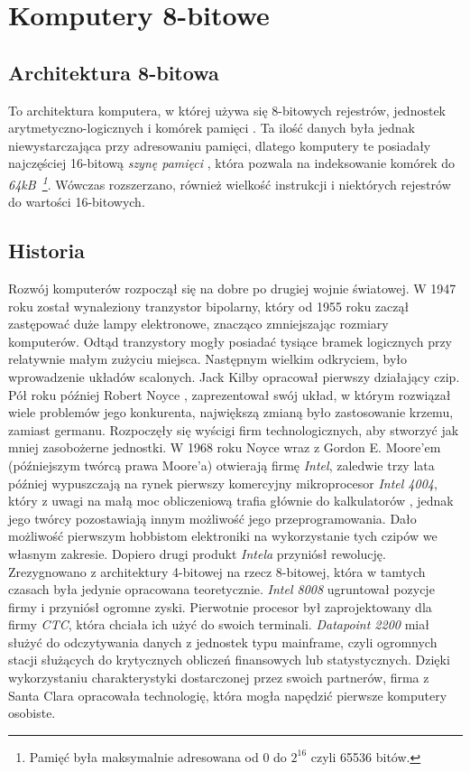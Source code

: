 \section{Komputery 8-bitowe}
\subsection{Architektura 8-bitowa}
To architektura komputera, w której używa się 8-bitowych rejestrów, jednostek \\arytmetyczno-logicznych i komórek pamięci \cite{Stakem}. Ta ilość danych była jednak niewystarczająca przy adresowaniu pamięci, dlatego komputery te posiadały najczęściej 16-bitową \textit{szynę pamięci} \cite{Stakem}, która pozwala na indeksowanie komórek do \textit{64kB~\footnote{Pamięć była maksymalnie adresowana od 0 do $2^{16}$ czyli 65536 bitów.}}. Wówczas rozszerzano, również wielkość instrukcji i niektórych rejestrów do wartości 16-bitowych.

\subsection{Historia}
Rozwój komputerów rozpoczął się na dobre po drugiej wojnie światowej. W 1947 roku został wynaleziony tranzystor bipolarny, który od 1955 roku zaczął zastępować duże lampy elektronowe, znacząco zmniejszając rozmiary komputerów. Odtąd tranzystory mogły posiadać tysiące bramek logicznych przy relatywnie małym zużyciu miejsca. Następnym wielkim odkryciem, było wprowadzenie układów scalonych. Jack Kilby opracował pierwszy działający czip. Pół roku później Robert Noyce \cite{Petzold}, zaprezentował swój układ, w którym rozwiązał wiele problemów jego konkurenta, największą zmianą było zastosowanie krzemu, zamiast germanu. Rozpoczęły się wyścigi firm technologicznych, aby stworzyć jak mniej zasobożerne jednostki. W 1968 roku Noyce wraz z Gordon E. Moore'em (późniejszym twórcą prawa Moore'a) otwierają firmę \textit{Intel}, zaledwie trzy lata później wypuszczają na rynek pierwszy komercyjny \cite{Stakem} mikroprocesor \textit{Intel 4004}, który z uwagi na małą moc obliczeniową trafia głównie do kalkulatorów \cite{Petzold}, jednak jego twórcy pozostawiają innym możliwość jego przeprogramowania. Dało możliwość pierwszym hobbistom elektroniki na wykorzystanie tych czipów we własnym zakresie. Dopiero drugi produkt \textit{Intela} przyniósł rewolucję. Zrezygnowano z architektury 4-bitowej na rzecz 8-bitowej, która w tamtych czasach była jedynie opracowana teoretycznie. \textit{Intel 8008} ugruntował pozycje firmy i przyniósł ogromne zyski. Pierwotnie procesor był zaprojektowany dla firmy \textit{CTC}, która chciała ich użyć do swoich terminali. \textit{Datapoint 2200} \cite{Stakem} miał służyć do odczytywania danych z jednostek typu mainframe, czyli ogromnych stacji służących do krytycznych obliczeń finansowych lub statystycznych. Dzięki wykorzystaniu charakterystyki dostarczonej przez swoich  partnerów, firma z Santa Clara opracowała technologię, która mogła napędzić pierwsze komputery osobiste. \\

